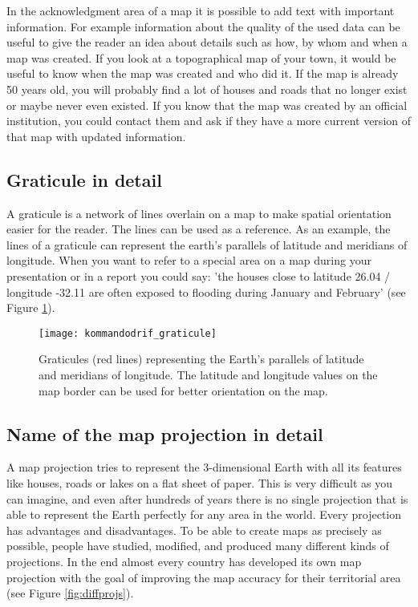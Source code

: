 In the acknowledgment area of a map it is possible to add text with important
information. For example information about the quality of the used data can
be useful to give the reader an idea about details such as how, by whom and
when a map was created. If you look at a topographical map of your town, it
would be useful to know when the map was created and who did it. If the map
is already 50 years old, you will probably find a lot of houses and roads
that no longer exist or maybe never even existed. If you know that the map
was created by an official institution, you could contact them and ask if
they have a more current version of that map with updated information. 

\subsection{Graticule in detail}

A graticule is a network of lines overlain on a map to make spatial
orientation easier for the reader. The lines can be used as a reference. As
an example, the lines of a graticule can represent the earth's parallels of
latitude and meridians of longitude. When you want to refer to a special area
on a map during your presentation or in a report you could say: 'the houses
close to latitude 26.04 / longitude -32.11 are often exposed to flooding
during January and February' (see Figure \ref{fig:graticule}).

\begin{figure}[ht]
   \begin{center}
   \caption{Graticules (red lines) representing the Earth's parallels of
latitude and meridians of longitude. The latitude and longitude values on the
map border can be used for better orientation on the map.}
\label{fig:graticule}\smallskip
   \texttt{[image: kommandodrif\_graticule]}
\end{center}
\end{figure}

\subsection{Name of the map projection in detail}

A map projection tries to represent the 3-dimensional Earth with all its
features like houses, roads or lakes on a flat sheet of paper. This is very
difficult as you can imagine, and even after hundreds of years there is no
single projection that is able to represent the Earth perfectly for any area
in the world. Every projection has advantages and disadvantages. 
To be able to create maps as precisely as possible, people have studied,
modified, and produced many different kinds of projections. In the end almost
every country has developed its own map projection with the goal of improving
the map accuracy for their territorial area (see Figure \ref{fig:diffprojs}).

